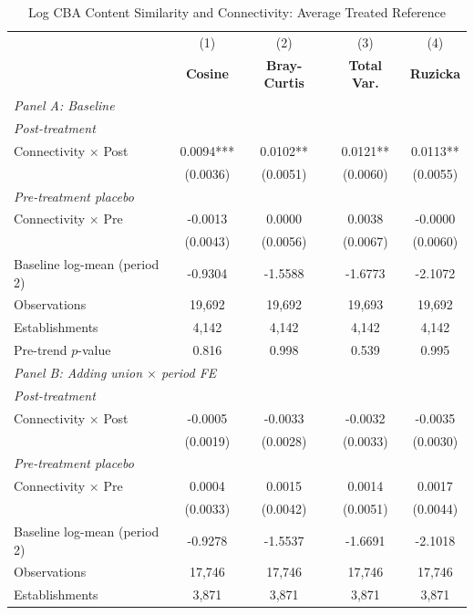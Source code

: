 \begin{table}[H]
\centering
\caption{Log CBA Content Similarity and Connectivity: Average Treated Reference}
\scriptsize
\setlength{\tabcolsep}{8pt}
\begin{tabular}{lcccc}
\hline\hline
 & (1) & (2) & (3) & (4) \\
 & \textbf{Cosine} & \textbf{Bray-Curtis} & \textbf{Total Var.} & \textbf{Ruzicka} \\
\hline
\multicolumn{5}{l}{\textit{Panel A: Baseline}} \\
\multicolumn{5}{l}{\textit{Post-treatment}} \\
Connectivity $\times$ Post & 0.0094*** & 0.0102** & 0.0121** & 0.0113** \\
 & (0.0036) & (0.0051) & (0.0060) & (0.0055) \\
\multicolumn{5}{l}{\textit{Pre-treatment placebo}} \\
Connectivity $\times$ Pre & -0.0013 & 0.0000 & 0.0038 & -0.0000 \\
 & (0.0043) & (0.0056) & (0.0067) & (0.0060) \\
\hline
Baseline log-mean (period 2) & -0.9304 & -1.5588 & -1.6773 & -2.1072 \\
Observations &       19,692 &       19,692 &       19,693 &       19,692 \\
Establishments &        4,142 &        4,142 &        4,142 &        4,142 \\
Pre-trend $p$-value & 0.816 & 0.998 & 0.539 & 0.995 \\
\hline
\multicolumn{5}{l}{\textit{Panel B: Adding union $\times$ period FE}} \\
\multicolumn{5}{l}{\textit{Post-treatment}} \\
Connectivity $\times$ Post & -0.0005 & -0.0033 & -0.0032 & -0.0035 \\
 & (0.0019) & (0.0028) & (0.0033) & (0.0030) \\
\multicolumn{5}{l}{\textit{Pre-treatment placebo}} \\
Connectivity $\times$ Pre & 0.0004 & 0.0015 & 0.0014 & 0.0017 \\
 & (0.0033) & (0.0042) & (0.0051) & (0.0044) \\
\hline
Baseline log-mean (period 2) & -0.9278 & -1.5537 & -1.6691 & -2.1018 \\
Observations &       17,746 &       17,746 &       17,746 &       17,746 \\
Establishments &        3,871 &        3,871 &        3,871 &        3,871 \\

\end{tabular}
\end{table}
